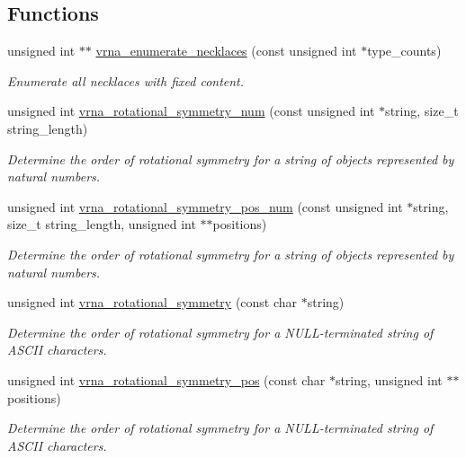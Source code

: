 \subsection*{Functions}
\begin{DoxyCompactItemize}
\item 
unsigned int $\ast$$\ast$ \hyperlink{group__combinatorics__utils_gae081ac655a76bd5c4b3d86c60b096b75}{vrna\+\_\+enumerate\+\_\+necklaces} (const unsigned int $\ast$type\+\_\+counts)
\begin{DoxyCompactList}\small\item\em Enumerate all necklaces with fixed content. \end{DoxyCompactList}\item 
unsigned int \hyperlink{group__combinatorics__utils_gac51464b5281833a58c25f9447252c495}{vrna\+\_\+rotational\+\_\+symmetry\+\_\+num} (const unsigned int $\ast$string, size\+\_\+t string\+\_\+length)
\begin{DoxyCompactList}\small\item\em Determine the order of rotational symmetry for a string of objects represented by natural numbers. \end{DoxyCompactList}\item 
unsigned int \hyperlink{group__combinatorics__utils_ga95b5a6ac35da982e2a766f8d2f98a2e1}{vrna\+\_\+rotational\+\_\+symmetry\+\_\+pos\+\_\+num} (const unsigned int $\ast$string, size\+\_\+t string\+\_\+length, unsigned int $\ast$$\ast$positions)
\begin{DoxyCompactList}\small\item\em Determine the order of rotational symmetry for a string of objects represented by natural numbers. \end{DoxyCompactList}\item 
unsigned int \hyperlink{group__combinatorics__utils_gae1dec02c4b63f303ce06a9293d316762}{vrna\+\_\+rotational\+\_\+symmetry} (const char $\ast$string)
\begin{DoxyCompactList}\small\item\em Determine the order of rotational symmetry for a N\+U\+L\+L-\/terminated string of A\+S\+C\+II characters. \end{DoxyCompactList}\item 
unsigned int \hyperlink{group__combinatorics__utils_ga294d48935fcac87ab335d771fe289ecb}{vrna\+\_\+rotational\+\_\+symmetry\+\_\+pos} (const char $\ast$string, unsigned int $\ast$$\ast$positions)
\begin{DoxyCompactList}\small\item\em Determine the order of rotational symmetry for a N\+U\+L\+L-\/terminated string of A\+S\+C\+II characters. \end{DoxyCompactList}\item 
$$
\end{DoxyCompactItemize}
